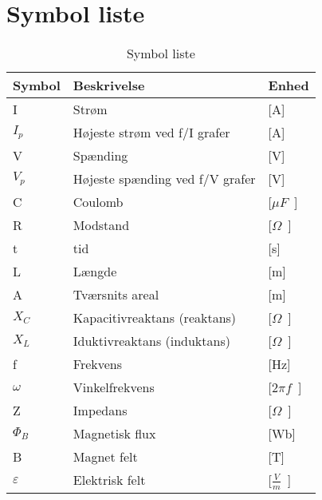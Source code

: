 
\chapter{Symbol liste}
\begin{table}[H]
\centering
\caption{Symbol liste}
\label{my-label}
\begin{tabular}{lll}
\multicolumn{1}{l|}{Symbol} & \multicolumn{1}{l|}{Beskrivelse} & Enhed              \\ \hline
I                           & Strøm                            &  [\si{A}]     \\
$I_p$                           & Højeste strøm ved f/I grafer          & [\si{A}]       \\
V                           & Spænding                         & [\si{V}]       \\
$V_p$                           & Højeste spænding ved f/V grafer          & [\si{V}]       \\
C                           &   Coulomb                    & [\si{$\mu F$}] \\
R                           & Modstand                         & [\si{$\Omega$}]  \\
t                           & tid                              & [\si{s}]     \\
L                           & Længde                           & [\si{m}]       \\
A                           & Tværsnits areal                         & [\si{m}]       \\
$ X_C $                      & Kapacitivreaktans (reaktans)     & [\si{$\Omega$}]          \\
$ X_L $                      & Iduktivreaktans (induktans)      & [\si{$\Omega$}]          \\
f                           & Frekvens                          & [\si{Hz}]                 \\
$ \omega $                    & Vinkelfrekvens                   & [\si{$2 \pi f $}]        \\
Z                           & Impedans                         & [\si{$\Omega$}]           \\
$ \Phi_B $                    & Magnetisk flux                   & [\si{Wb}]      \\
B                           & Magnet felt                      &  [\si{T}]   \\
$ \varepsilon $               & Elektrisk felt                   & [\si{$\frac{V}{m}$}]  \\

\end{tabular}
\end{table}
